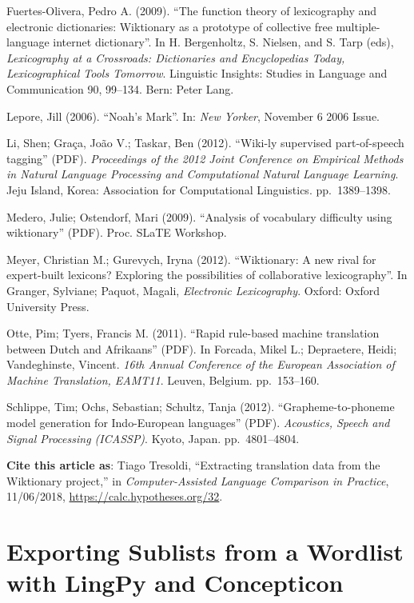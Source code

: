 \documentclass[
  english,
  a4paper,
  oneside,tablecaptionabove
]{scrbook}
\begin{document}
Fuertes-Olivera, Pedro A. (2009). \enquote{The function theory of
lexicography and electronic dictionaries: Wiktionary as a prototype of
collective free multiple-language internet dictionary}. In H.
Bergenholtz, S. Nielsen, and S. Tarp (eds), \emph{Lexicography at a
Crossroads: Dictionaries and Encyclopedias Today, Lexicographical Tools
Tomorrow}. Linguistic Insights: Studies in Language and Communication
90, 99--134. Bern: Peter Lang.

Lepore, Jill (2006). \enquote{Noah's Mark}. In: \emph{New Yorker},
November 6 2006 Issue.

Li, Shen; Graça, João V.; Taskar, Ben (2012). \enquote{Wiki-ly
supervised part-of-speech tagging} (PDF). \emph{Proceedings of the 2012
Joint Conference on Empirical Methods in Natural Language Processing and
Computational Natural Language Learning}. Jeju Island, Korea:
Association for Computational Linguistics. pp.~1389--1398.

Medero, Julie; Ostendorf, Mari (2009). \enquote{Analysis of vocabulary
difficulty using wiktionary} (PDF). Proc. SLaTE Workshop.

Meyer, Christian M.; Gurevych, Iryna (2012). \enquote{Wiktionary: A new
rival for expert-built lexicons? Exploring the possibilities of
collaborative lexicography}. In Granger, Sylviane; Paquot, Magali,
\emph{Electronic Lexicography}. Oxford: Oxford University Press.

Otte, Pim; Tyers, Francis M. (2011). \enquote{Rapid rule-based machine
translation between Dutch and Afrikaans} (PDF). In Forcada, Mikel L.;
Depraetere, Heidi; Vandeghinste, Vincent. \emph{16th Annual Conference
of the European Association of Machine Translation, EAMT11}. Leuven,
Belgium. pp.~153--160.

Schlippe, Tim; Ochs, Sebastian; Schultz, Tanja (2012).
\enquote{Grapheme-to-phoneme model generation for Indo-European
languages} (PDF). \emph{Acoustics, Speech and Signal Processing
(ICASSP)}. Kyoto, Japan. pp.~4801--4804.

\textbf{Cite this article as}: Tiago Tresoldi, ``Extracting translation
data from the Wiktionary project,'' in \emph{Computer-Assisted Language
Comparison in Practice}, 11/06/2018,
\url{https://calc.hypotheses.org/32}.

\hypertarget{exporting-sublists-from-a-wordlist-with-lingpy-and-concepticon}{%
\chapter{Exporting Sublists from a Wordlist with LingPy and
Concepticon}\label{exporting-sublists-from-a-wordlist-with-lingpy-and-concepticon}}
\end{document}
